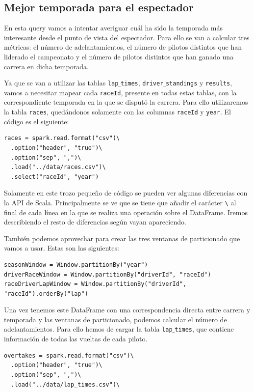 \documentclass[12pt,twoside,titlepage]{report}
\begin{document}
\subsection{Mejor temporada para el espectador}
En esta query vamos a intentar averiguar cuál ha sido la temporada más interesante desde el punto de vista del espectador. Para ello se van a calcular tres métricas: el número de adelantamientos, el número de pilotos distintos que han liderado el campeonato y el número de pilotos distintos que han ganado una carrera en dicha temporada.

Ya que se van a utilizar las tablas \texttt{lap$\_$times}, \texttt{driver$\_$standings} y \texttt{results}, vamos a necesitar mapear cada \texttt{raceId}, presente en todas estas tablas, con la correspondiente temporada en la que se disputó la carrera. Para ello utilizaremos la tabla \texttt{races}, quedándonos solamente con las columnas \texttt{raceId} y \texttt{year}. El código es el siguiente:

\begin{lstlisting}
races = spark.read.format("csv")\
  .option("header", "true")\
  .option("sep", ",")\
  .load("../data/races.csv")\
  .select("raceId", "year")
\end{lstlisting}

Solamente en este trozo pequeño de código se pueden ver algunas diferencias con la API de Scala. Principalmente se ve que se tiene que añadir el carácter \texttt{\textbackslash} al final de cada línea en la que se realiza una operación sobre el DataFrame. Iremos describiendo el resto de diferencias según vayan apareciendo.

También podemos aprovechar para crear las tres ventanas de particionado que vamos a usar. Estas son las siguientes:

\begin{lstlisting}
seasonWindow = Window.partitionBy("year")
driverRaceWindow = Window.partitionBy("driverId", "raceId")
raceDriverLapWindow = Window.partitionBy("driverId", "raceId").orderBy("lap")
\end{lstlisting}

Una vez tenemos este DataFrame con una correspondencia directa entre carrera y temporada y las ventanas de particionado, podemos calcular el número de adelantamientos. Para ello hemos de cargar la tabla \texttt{lap$\_$times}, que contiene información de todas las vueltas de cada piloto.

\begin{lstlisting}
overtakes = spark.read.format("csv")\
  .option("header", "true")\
  .option("sep", ",")\
  .load("../data/lap_times.csv")\
\end{lstlisting}
\end{document}
